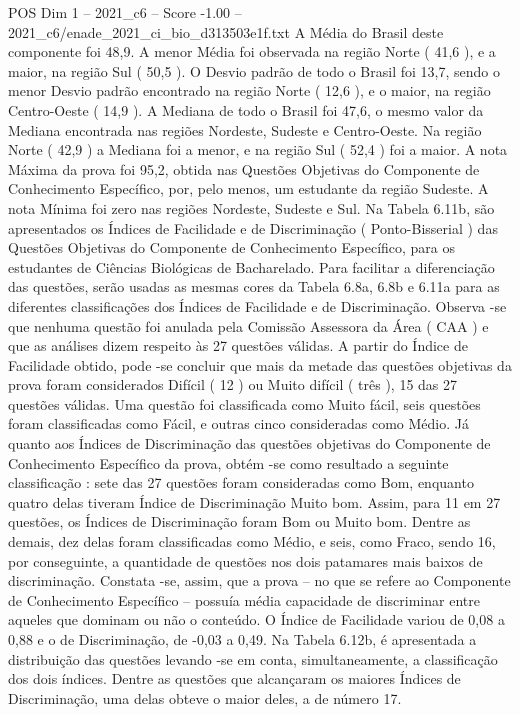 \begin{textsample}{POS Dim 1 – 2021\_c6 – Score -1.00 – 2021\_c6/enade\_2021\_ci\_bio\_d313503e1f.txt}
A Média do Brasil deste componente foi 48,9.
A menor Média foi observada na região Norte ( 41,6 ), e a maior, na região Sul ( 50,5 ).
O Desvio padrão de todo o Brasil foi 13,7, sendo o menor Desvio padrão encontrado na região Norte ( 12,6 ), e o maior, na região Centro-Oeste ( 14,9 ).
A Mediana de todo o Brasil foi 47,6, o mesmo valor da Mediana encontrada nas regiões Nordeste, Sudeste e Centro-Oeste.
Na região Norte ( 42,9 ) a Mediana foi a menor, e na região Sul ( 52,4 ) foi a maior.
A nota Máxima da prova foi 95,2, obtida nas Questões Objetivas do Componente de Conhecimento Específico, por, pelo menos, um estudante da região Sudeste.
A nota Mínima foi zero nas regiões Nordeste, Sudeste e Sul.
Na Tabela 6.11b, são apresentados os Índices de Facilidade e de Discriminação ( Ponto-Bisserial ) das Questões Objetivas do Componente de Conhecimento Específico, para os estudantes de Ciências Biológicas de Bacharelado.
Para facilitar a diferenciação das questões, serão usadas as mesmas cores da Tabela 6.8a, 6.8b e 6.11a para as diferentes classificações dos Índices de Facilidade e de Discriminação.
Observa -se que nenhuma questão foi anulada pela Comissão Assessora da Área ( CAA ) e que as análises dizem respeito às 27 questões válidas.
A partir do Índice de Facilidade obtido, pode -se concluir que mais da metade das questões objetivas da prova foram considerados Difícil ( 12 ) ou Muito difícil ( três ), 15 das 27 questões válidas.
Uma questão foi classificada como Muito fácil, seis questões foram classificadas como Fácil, e outras cinco consideradas como Médio.
Já quanto aos Índices de Discriminação das questões objetivas do Componente de Conhecimento Específico da prova, obtém -se como resultado a seguinte classificação : sete das 27 questões foram consideradas como Bom, enquanto quatro delas tiveram Índice de Discriminação Muito bom.
Assim, para 11 em 27 questões, os Índices de Discriminação foram Bom ou Muito bom.
Dentre as demais, dez delas foram classificadas como Médio, e seis, como Fraco, sendo 16, por conseguinte, a quantidade de questões nos dois patamares mais baixos de discriminação.
Constata -se, assim, que a prova – no que se refere ao Componente de Conhecimento Específico – possuía média capacidade de discriminar entre aqueles que dominam ou não o conteúdo.
O Índice de Facilidade variou de 0,08 a 0,88 e o de Discriminação, de -0,03 a 0,49.
Na Tabela 6.12b, é apresentada a distribuição das questões levando -se em conta, simultaneamente, a classificação dos dois índices.
Dentre as questões que alcançaram os maiores Índices de Discriminação, uma delas obteve o maior deles, a de número 17.

\end{textsample}
